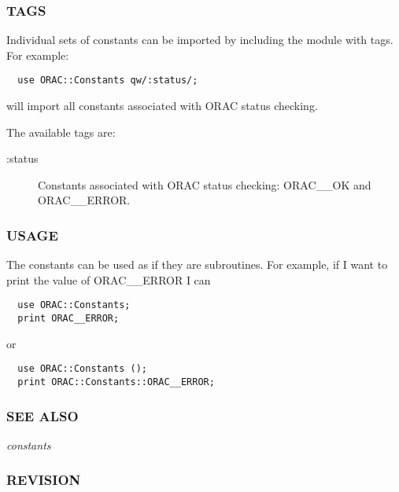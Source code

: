 \subsubsection*{TAGS\label{ORAC::Constants_TAGS}}


Individual sets of constants can be imported by
including the module with tags. For example:

\begin{verbatim}
  use ORAC::Constants qw/:status/;
\end{verbatim}


will import all constants associated with ORAC status checking.



The available tags are:

\begin{description}

\item[{:status}] \mbox{}

Constants associated with ORAC status checking: ORAC\_\_OK and ORAC\_\_ERROR.

\end{description}
\subsubsection*{USAGE\label{ORAC::Constants_USAGE}}


The constants can be used as if they are subroutines.
For example, if I want to print the value of ORAC\_\_ERROR I can

\begin{verbatim}
  use ORAC::Constants;
  print ORAC__ERROR;
\end{verbatim}


or

\begin{verbatim}
  use ORAC::Constants ();
  print ORAC::Constants::ORAC__ERROR;
\end{verbatim}
\subsubsection*{SEE ALSO\label{ORAC::Constants_SEE_ALSO}}


\emph{constants}

\subsubsection*{REVISION\label{ORAC::Constants_REVISION}}



